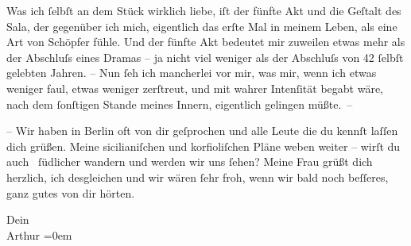 \pstart
           Was ich{ }ſelbſt an dem Stück
               wirklich liebe, iſt der fünfte Akt und die {\pb}Geſtalt des Sala, der gegenüber ich mich,
               eigentlich das erſte Mal in meinem Leben, als eine Art von Schöpfer fühle. Und der
               fünfte Akt bedeutet mir zuweilen etwas mehr als der Abschluſs eines Dramas – ja nicht
               viel weniger als der Abschluſs von 42{ }ſelbſt gelebten Jahren. \introOben{}–\introOben{} Nun{ }ſeh ich mancherlei vor mir, was mir, wenn ich etwas weniger faul,
               etwas weniger zerſtreut, und mit \strikeout{\textcolor{gray}{×}\-\textcolor{gray}{×}\-\textcolor{gray}{×}\-\textcolor{gray}{×}-} wahrer Intenſität
               begabt wäre, nach dem{ }ſonſtigen Stande meines Innern, eigentlich gelingen
               müßte. –\pend
           
\pstart
           {\pb}– Wir haben in Berlin oft von dir geſprochen und alle Leute die
               du kennſt laſſen dich grüßen. Meine sicilianiſchen und korfioliſchen Pläne
               weben weiter – wirſt du auch  ſüdlicher wandern und werden wir uns{ }ſehen? Meine Frau grüßt dich herzlich, ich
               desgleichen und wir wären{ }ſehr froh, wenn wir bald noch beſſeres, ganz gutes von dir
               hörten.\pend
           
\pstart
           Dein{\\[\baselineskip]}\spacefill\mbox{Arthur}\pend
           \leftskip=0em{}\endnumbering{}  \newcommand{\dateiname}{L01376}\newcommand{\titel}{Arthur Schnitzler an Hermann Bahr, 22. 2. 1904}\newcommand{\editorInnen}{Herausgegeben von Martin Anton Müller}
